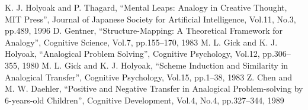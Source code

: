 \documentclass{deimj}
\begin{document}
\vspace{2em}
\begin{thebibliography}{99}
  K. J. Holyoak and P. Thagard,
    ``Mental Leaps: Analogy in Creative Thought, MIT Press'',
    Journal of Japanese Society for Artificial Intelligence,  Vol.11, No.3,  pp.489, 1996
  D. Gentner,
    ``Structure-Mapping: A Theoretical Framework for Analogy'',
    Cognitive Science, Vol.7, pp.155–170, 1983
  M. L. Gick and K. J. Holyoak,
    ``Analogical Problem Solving'',
    Cognitive Psychology, Vol.12, pp.306–355, 1980
  M. L. Gick and K. J. Holyoak,
    ``Scheme Induction and Similarity in Analogical Transfer'',
    Cognitive Psychology, Vol.15, pp.1–38, 1983
  Z. Chen and M. W. Daehler,
    ``Positive and Negative Transfer in Analogical Problem-solving by 6-years-old Children'',
    Cognitive Development, Vol.4, No.4, pp.327–344, 1989

\end{thebibliography}
\end{document}
